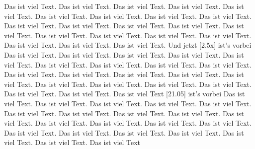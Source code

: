 \documentclass[english,ngerman,ttfont=roboto,ToDo=inline]{tudscrmanual}
\begin{document}
\makeatletter

    
Das ist viel Text. Das ist viel Text. Das ist viel Text. Das ist viel Text. Das 
ist viel Text. Das ist viel Text. Das ist viel Text. Das ist viel Text. Das ist 
viel Text. Das ist viel Text. Das ist viel Text. Das ist viel Text. Das ist 
viel Text. Das ist viel Text. Das ist viel Text. Das ist viel Text. Das ist 
viel Text. Das ist viel Text. Das ist viel Text. Das ist viel Text. Das ist 
viel Text. Und jetzt 
[2.5x]
ist's vorbei
Das ist viel Text. Das ist viel Text. Das ist viel Text. Das ist viel Text. Das 
ist viel Text. Das ist viel Text. Das ist viel Text. Das ist viel Text. Das ist 
viel Text. Das ist viel Text. Das ist viel Text. Das ist viel Text. Das ist 
viel Text. Das ist viel Text. 
Das ist viel Text. Das ist viel Text. Das ist 
viel Text. Das ist viel Text. Das ist viel Text. Das ist viel Text. Das ist 
viel Text 
[21.05] ist's vorbei
Das ist viel Text. Das ist viel Text. Das ist viel Text. Das ist viel Text. Das 
ist viel Text. Das ist viel Text. Das ist viel Text. Das ist viel Text. Das ist 
viel Text. Das ist viel Text. Das ist viel Text. Das ist viel Text. Das ist 
viel Text. Das ist viel Text. Das ist viel Text. Das ist viel Text. Das ist 
viel Text. Das ist viel Text. Das ist viel Text. Das ist viel Text. Das ist 
viel Text
\ListOfToDo

%
%
%
%
\end{document}
